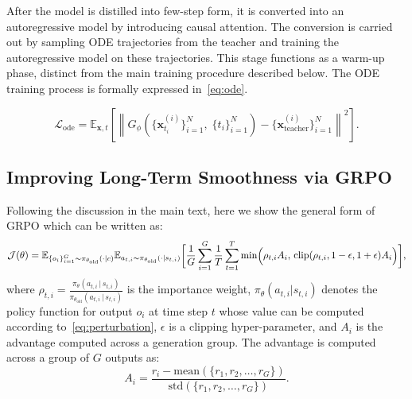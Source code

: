 After the model is distilled into few-step form, it is converted into an autoregressive model by introducing causal attention. The conversion is carried out by sampling ODE trajectories from the teacher and training the autoregressive model on these trajectories. This stage functions as a warm-up phase, distinct from the main training procedure described below. The ODE training process is formally expressed in~\cref{eq:ode}.

\begin{equation}
\mathcal{L}_{\mathrm{ode}}
= \mathbb{E}_{\mathbf{x},t}\!\left[
    \left\|
       G_{\phi}\!\left(\{\mathbf{x}_{t_i}^{(i)}\}_{i=1}^N,\;\{t_i\}_{i=1}^N\right)
       - \{\mathbf{x}_{\mathrm{teacher}}^{(i)}\}_{i=1}^N
    \right\|^2
\right].
\label{eq:ode}
\end{equation}


\subsection{Improving Long-Term Smoothness via GRPO}
\label{appendix.sec.grpo}
Following the discussion in the main text, here we show the general form of GRPO which can be written as:
\begingroup
\begin{equation}
\footnotesize
\mathcal{J}(\theta) = 
\mathbb{E}_{\{o_i\}_{i=1}^G \sim \pi_{\theta_{\mathrm{old}}}(\cdot|c)}
\mathbb{E}_{a_{t,i}\sim \pi_{\theta_{\mathrm{old}}}(\cdot|s_{t,i})}
\Biggl[
\frac{1}{G}\sum_{i=1}^G \frac{1}{T}\sum_{t=1}^T 
\min\Bigl(\rho_{t,i} A_i, \,
\mathrm{clip}(\rho_{t,i}, 1-\epsilon, 1+\epsilon) A_i\Bigr)
\Biggr],
\label{eq:grpo}
\end{equation}
\endgroup
where $\rho_{t,i} = \tfrac{\pi_{\theta}(a_{t,i}\,|\,s_{t,i})}{\pi_{\theta_{\mathrm{old}}}(a_{t,i}\,|\,s_{t,i})}$ is the importance weight, 
$\pi_{\theta}(a_{t,i}|s_{t,i})$ denotes the policy function for output $o_i$ at time step $t$ whose value can be computed according to~\cref{eq:perturbation}, $\epsilon$ is a clipping hyper-parameter, and $A_i$ is the advantage computed across a generation group. The advantage is computed across a group of $G$ outputs as:
\begin{equation}
A_i = \frac{r_i - \mathrm{mean}(\{r_1, r_2, \dots, r_G\})}{\mathrm{std}(\{r_1, r_2, \dots, r_G\})}.
\label{eq:advantage}
\end{equation}


